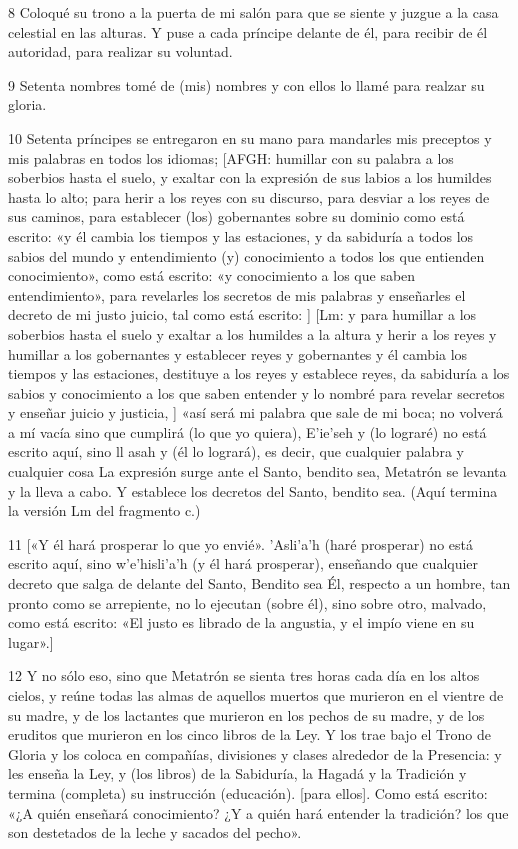 \par 8 Coloqué su trono a la puerta de mi salón para que se siente y juzgue a la casa celestial en las alturas. Y puse a cada príncipe delante de él, para recibir de él autoridad, para realizar su voluntad.

\par 9 Setenta nombres tomé de (mis) nombres y con ellos lo llamé para realzar su gloria.

\par 10 Setenta príncipes se entregaron en su mano para mandarles mis preceptos y mis palabras en todos los idiomas; [AFGH: humillar con su palabra a los soberbios hasta el suelo, y exaltar con la expresión de sus labios a los humildes hasta lo alto; para herir a los reyes con su discurso, para desviar a los reyes de sus caminos, para establecer (los) gobernantes sobre su dominio como está escrito: «y él cambia los tiempos y las estaciones, y da sabiduría a todos los sabios del mundo y entendimiento (y) conocimiento a todos los que entienden conocimiento», como está escrito: «y conocimiento a los que saben entendimiento», para revelarles los secretos de mis palabras y enseñarles el decreto de mi justo juicio, tal como está escrito: ] [Lm: y para humillar a los soberbios hasta el suelo y exaltar a los humildes a la altura y herir a los reyes y humillar a los gobernantes y establecer reyes y gobernantes y él cambia los tiempos y las estaciones, destituye a los reyes y establece reyes, da sabiduría a los sabios y conocimiento a los que saben entender y lo nombré para revelar secretos y enseñar juicio y justicia, ] «así será mi palabra que sale de mi boca; no volverá a mí vacía sino que cumplirá (lo que yo quiera), E'ie'seh y (lo lograré) no está escrito aquí, sino ll asah y (él lo logrará), es decir, que cualquier palabra y cualquier cosa La expresión surge ante el Santo, bendito sea, Metatrón se levanta y la lleva a cabo. Y establece los decretos del Santo, bendito sea. (Aquí termina la versión Lm del fragmento c.)

\par 11 [«Y él hará prosperar lo que yo envié». 'Asli'a'h (haré prosperar) no está escrito aquí, sino w'e'hisli'a'h (y él hará prosperar), enseñando que cualquier decreto que salga de delante del Santo, Bendito sea Él, respecto a un hombre, tan pronto como se arrepiente, no lo ejecutan (sobre él), sino sobre otro, malvado, como está escrito: «El justo es librado de la angustia, y el impío viene en su lugar».]

\par 12 Y no sólo eso, sino que Metatrón se sienta tres horas cada día en los altos cielos, y reúne todas las almas de aquellos muertos que murieron en el vientre de su madre, y de los lactantes que murieron en los pechos de su madre, y de los eruditos que murieron en los cinco libros de la Ley. Y los trae bajo el Trono de Gloria y los coloca en compañías, divisiones y clases alrededor de la Presencia: y les enseña la Ley, y (los libros) de la Sabiduría, la Hagadá y la Tradición y termina (completa) su instrucción (educación). [para ellos]. Como está escrito: «¿A quién enseñará conocimiento? ¿Y a quién hará entender la tradición? los que son destetados de la leche y sacados del pecho».


